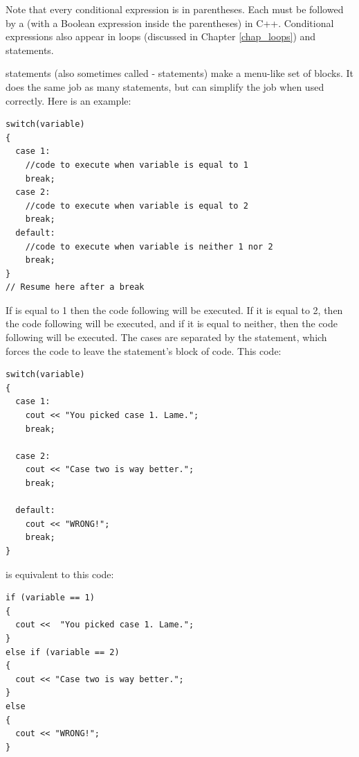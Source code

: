 Note that every conditional expression is in parentheses.
Each  must be followed by a  (with a Boolean expression inside the parentheses) in C++.
Conditional expressions also appear in loops (discussed in Chapter \ref{chap_loops}) and  statements.


 statements (also sometimes called - statements) make a menu-like set of blocks. 
It does the same job as many  statements, but can simplify the job when used correctly. 
Here is an example:

\noindent\begin{minipage}{\linewidth}\begin{lstlisting}
switch(variable)
{
  case 1:
    //code to execute when variable is equal to 1
    break;
  case 2:
    //code to execute when variable is equal to 2
    break;
  default:
    //code to execute when variable is neither 1 nor 2
    break;
}
// Resume here after a break
\end{lstlisting}\end{minipage}

If  is equal to 1 then the code following  will be executed.
If it is equal to 2, then the code following  will be executed, and if it is equal to neither, then the code following  will be executed. 
The cases are separated by the  statement, which forces the code to leave the  statement's block of code. This code: \nopagebreak[4]

\noindent\begin{minipage}{\linewidth}\begin{lstlisting}
switch(variable)
{
  case 1:
    cout << "You picked case 1. Lame.";
    break;

  case 2:
    cout << "Case two is way better.";
    break;

  default:
    cout << "WRONG!";
    break;
}
\end{lstlisting}\end{minipage}

\noindent is equivalent to this code: \nopagebreak[4]

\noindent\begin{minipage}{\linewidth}\begin{lstlisting}
if (variable == 1)
{
  cout <<  "You picked case 1. Lame.";
}
else if (variable == 2)
{
  cout << "Case two is way better.";
}
else
{
  cout << "WRONG!";
}
\end{lstlisting}\end{minipage}

